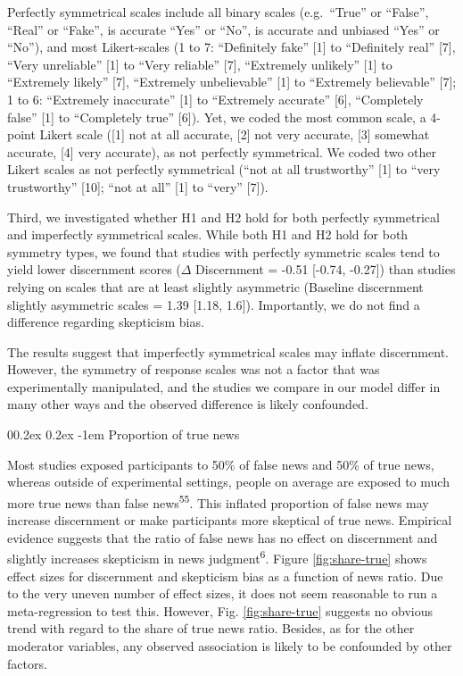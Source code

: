 \documentclass[
  man]{apa6}
\makeatletter
\let\oldparagraph\paragraph
\renewcommand{\paragraph}{
    \@ifstar
      \xxxParagraphStar
      \xxxParagraphNoStar
  }
\newcommand{\xxxParagraphStar}[1]{\oldparagraph*{#1}\mbox{}}
\newcommand{\xxxParagraphNoStar}[1]{\oldparagraph{#1}\mbox{}}
\renewcommand{\paragraph}{\@startsection{paragraph}{4}{\parindent}%
  {0\baselineskip \@plus 0.2ex \@minus 0.2ex}%
  {-1em}%
  {\normalfont\normalsize\bfseries\itshape\typesectitle}}
\makeatother
\begin{document}
Perfectly symmetrical scales include all binary scales (e.g.~``True'' or ``False'', ``Real'' or ``Fake'', is accurate ``Yes'' or ``No'', is accurate and unbiased ``Yes'' or ``No''), and most Likert-scales (1 to 7: ``Definitely fake'' {[}1{]} to ``Definitely real'' {[}7{]}, ``Very unreliable'' {[}1{]} to ``Very reliable'' {[}7{]}, ``Extremely unlikely'' {[}1{]} to ``Extremely likely'' {[}7{]}, ``Extremely unbelievable'' {[}1{]} to ``Extremely believable'' {[}7{]}; 1 to 6: ``Extremely inaccurate'' {[}1{]} to ``Extremely accurate'' {[}6{]}, ``Completely false'' {[}1{]} to ``Completely true'' {[}6{]}). Yet, we coded the most common scale, a 4-point Likert scale ({[}1{]} not at all accurate, {[}2{]} not very accurate, {[}3{]} somewhat accurate, {[}4{]} very accurate), as not perfectly symmetrical. We coded two other Likert scales as not perfectly symmetrical (``not at all trustworthy'' {[}1{]} to ``very trustworthy'' {[}10{]}; ``not at all'' {[}1{]} to ``very'' {[}7{]}).

Third, we investigated whether H1 and H2 hold for both perfectly symmetrical and imperfectly symmetrical scales. While both H1 and H2 hold for both symmetry types, we found that studies with perfectly symmetric scales tend to yield lower discernment scores (\(\Delta\) Discernment = -0.51 {[}-0.74, -0.27{]}) than studies relying on scales that are at least slightly asymmetric (Baseline discernment slightly asymmetric scales = 1.39 {[}1.18, 1.6{]}). Importantly, we do not find a difference regarding skepticism bias.

The results suggest that imperfectly symmetrical scales may inflate discernment. However, the symmetry of response scales was not a factor that was experimentally manipulated, and the studies we compare in our model differ in many other ways and the observed difference is likely confounded.

\paragraph{Proportion of true news}\label{proportion-of-true-news}

Most studies exposed participants to 50\% of false news and 50\% of true news, whereas outside of experimental settings, people on average are exposed to much more true news than false news\textsuperscript{55}. This inflated proportion of false news may increase discernment or make participants more skeptical of true news. Empirical evidence suggests that the ratio of false news has no effect on discernment and slightly increases skepticism in news judgment\textsuperscript{6}. Figure \ref{fig:share-true} shows effect sizes for discernment and skepticism bias as a function of news ratio. Due to the very uneven number of effect sizes, it does not seem reasonable to run a meta-regression to test this. However, Fig. \ref{fig:share-true} suggests no obvious trend with regard to the share of true news ratio. Besides, as for the other moderator variables, any observed association is likely to be confounded by other factors.
\end{document}
